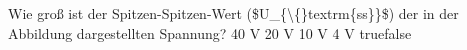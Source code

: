     {Wie groß ist der Spitzen-Spitzen-Wert (\$U\_\{\textbackslash\{\}textrm\{ss\}\}\$) der in der Abbildung dargestellten Spannung?}
    {40 V}
    {20 V}
    {10 V}
    {4 V}
    {true}{false}